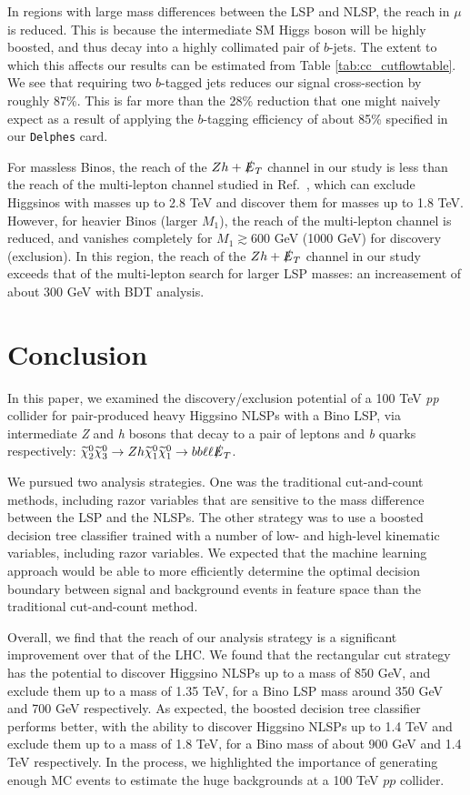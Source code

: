 \documentclass[a4paper,11pt]{article}
\newcommand{\N}{\widetilde{\chi}^0}
\newcommand{\met}{{\slashed{E}_T}}
\begin{document}
In regions with large mass differences between the LSP and NLSP, the reach in $\mu$ is
reduced.  This is because the intermediate SM Higgs boson will be highly boosted, and
thus decay into a highly collimated pair of $b$-jets. The extent to which this
affects our results can be estimated from Table \ref{tab:cc_cutflowtable}. We
see that requiring two $b$-tagged jets reduces our signal cross-section by
roughly 87\%. This is far more than the 28\% reduction that one might naively
expect as a result of applying the $b$-tagging efficiency of about 85\%
specified in our \texttt{Delphes} card.  
 
For massless Binos, the reach of the $Zh+\met$ channel in our study is less than the reach of the multi-lepton channel studied in Ref.~\cite{Gori:2014oua},
which can exclude Higgsinos with masses up to 2.8 TeV and discover them for masses 
up to 1.8 TeV.
However, for heavier Binos (larger $M_1$), the reach of the multi-lepton channel
is reduced, and vanishes completely for $M_1\gtrsim 600$ GeV (1000 GeV)
for discovery (exclusion). In this region, the reach of the $Zh+\met$ channel in our study exceeds that of the multi-lepton search for larger LSP masses: an increasement of about 300 GeV with BDT analysis.  


\section{Conclusion}\label{sec:conclusion}

In this paper, we examined the discovery/exclusion potential of a 100 TeV \emph{pp} collider
for pair-produced heavy Higgsino NLSPs with a Bino LSP, via intermediate \emph{Z} and
\emph{h} bosons that decay to a pair of leptons and \emph{b} quarks respectively:
$\N_2\N_3\rightarrow Zh \N_1\N_1\rightarrow bb\ell\ell \met$.

We pursued two analysis strategies. One was the traditional cut-and-count methods, including razor variables
that are sensitive to the mass difference between the LSP and the NLSPs. The
other strategy was to use a boosted decision tree classifier trained with a
number of low- and high-level kinematic variables, including razor variables. We expected
that the machine learning approach would be able to more efficiently determine
the optimal decision boundary between signal and background events in feature
space than the traditional   cut-and-count method.

Overall, we find that the reach of our analysis strategy is a significant
improvement over that of the LHC. We found that the rectangular cut strategy has
the potential to discover Higgsino NLSPs up to a mass of 850 GeV, and exclude
them up to a mass of 1.35 TeV, for a Bino LSP mass around 350 GeV and 700 GeV
respectively. 
As expected, the boosted decision tree classifier
performs better, with the ability to discover Higgsino NLSPs up to 1.4 TeV and
exclude them up to a mass of 1.8 TeV, for a Bino mass of about 900 GeV and 1.4
TeV respectively.   In the
process, we highlighted the importance of generating enough MC  events
to estimate the huge backgrounds at a 100 TeV $pp$ collider.   
\end{document}
